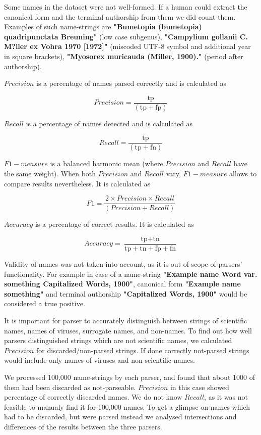\documentclass{bmcart}
\begin{document}
Some names in the dataset were not well-formed. If a human could extract the
canonical form and the terminal authorship from them we did count them.
Examples of such name-strings are \textbf{"Bumetopia (bumetopia)
quadripunctata Breuning"} (low case subgenus), \textbf{"Campylium gollanii C.
M?ller ex Vohra 1970 [1972]"} (miscoded UTF-8 symbol and additional year in
square brackets), \textbf{"Myosorex muricauda (Miller, 1900)."} (period after
authorship).

$Precision$ is a percentage of names parsed correctly and is calculated as

\[Precision = \dfrac{\text{tp}}{(\text{tp} + \text{fp})}\]

$Recall$ is a percentage of names detected and is calculated as

\[Recall = \dfrac{\text{tp}}{(\text{tp} + \text{fn})}\]

$F1-measure$ is a balanced harmonic mean (where $Precision$ and $Recall$ have
the same weight). When both $Precision$ and $Recall$ vary, $F1-measure$ allows
to compare results nevertheless. It is calculated as

\[F1 = \dfrac{2 \times Precision \times Recall}{(Precision + Recall)}\]

$Accuracy$ is a percentage of correct results. It is calculated as

\[Accuracy = \dfrac{\text{tp} + \text{tn}}
  {\text{tp} + \text{tn} + \text{fp} + \text{fn}}\]

Validity of names was not taken into account, as it is out of scope of
parsers' functionality. For example in case of a name-string \textbf{"Example
name Word var.  something Capitalized Words, 1900"}, canonical form
\textbf{"Example name something"} and terminal authorship \textbf{"Capitalized
Words, 1900"} would be considered a true positive.

It is important for parser to accurately distinguish between strings of
scientific names, names of viruses, surrogate names, and non-names. To find
out how well parsers distinguished strings which are not scientific names, we
calculated $Precision$ for discarded/non-parsed strings. If done correctly
not-parsed strings would include only names of viruses and non-scientific
names.

We processed 100,000 name-strings by each parser, and found that about 1000 of
them had been discarded as not-parseable. $Precision$ in this case showed
percentage of correctly discarded names.  We do not know $Recall$, as it was
not feasible to manualy find it for 100,000 names. To get a glimpse on names
which had to be discarded, but were parsed instead we analysed intersections
and differences of the results between the three parsers.
\end{document}
